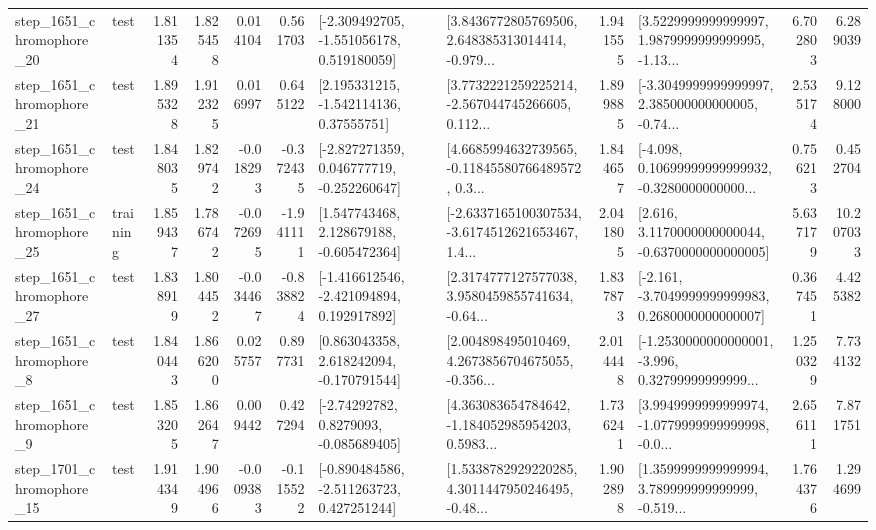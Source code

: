 \begin{tabular}{llrrrrllrlrr}
 step\_1651\_chromophore\_20 &      test &      1.811354 &    1.825458 &      0.014104 &  0.561703 &   [-2.309492705, -1.551056178, 0.519180059] &  [3.8436772805769506, 2.648385313014414, -0.979... &       1.941555 &  [3.5229999999999997, 1.9879999999999995, -1.13... &            6.702803 &          6.289039 \\
 step\_1651\_chromophore\_21 &      test &      1.895328 &    1.912325 &      0.016997 &  0.645122 &     [2.195331215, -1.542114136, 0.37555751] &  [3.7732221259225214, -2.567044745266605, 0.112... &       1.899885 &  [-3.3049999999999997, 2.385000000000005, -0.74... &            2.535174 &          9.128000 \\
 step\_1651\_chromophore\_24 &      test &      1.848035 &    1.829742 &     -0.018293 & -0.372435 &   [-2.827271359, 0.046777719, -0.252260647] &  [4.6685994632739565, -0.11845580766489572, 0.3... &       1.844657 &  [-4.098, 0.10699999999999932, -0.3280000000000... &            0.756213 &          0.452704 \\
 step\_1651\_chromophore\_25 &  training &      1.859437 &    1.786742 &     -0.072695 & -1.941111 &    [1.547743468, 2.128679188, -0.605472364] &  [-2.6337165100307534, -3.6174512621653467, 1.4... &       2.041805 &   [2.616, 3.1170000000000044, -0.6370000000000005] &            5.637179 &         10.207033 \\
 step\_1651\_chromophore\_27 &      test &      1.838919 &    1.804452 &     -0.034467 & -0.838824 &   [-1.416612546, -2.421094894, 0.192917892] &  [2.3174777127577038, 3.9580459855741634, -0.64... &       1.837873 &  [-2.161, -3.7049999999999983, 0.2680000000000007] &            0.367451 &          4.425382 \\
  step\_1651\_chromophore\_8 &      test &      1.840443 &    1.866200 &      0.025757 &  0.897731 &    [0.863043358, 2.618242094, -0.170791544] &  [2.004898495010469, 4.2673856704675055, -0.356... &       2.014448 &  [-1.2530000000000001, -3.996, 0.32799999999999... &            1.250329 &          7.734132 \\
  step\_1651\_chromophore\_9 &      test &      1.853205 &    1.862647 &      0.009442 &  0.427294 &      [-2.74292782, 0.8279093, -0.085689405] &  [4.363083654784642, -1.184052985954203, 0.5983... &       1.736241 &  [3.9949999999999974, -1.0779999999999998, -0.0... &            2.656111 &          7.871751 \\
 step\_1701\_chromophore\_15 &      test &      1.914349 &    1.904966 &     -0.009383 & -0.115522 &   [-0.890484586, -2.511263723, 0.427251244] &  [1.5338782929220285, 4.3011447950246495, -0.48... &       1.902898 &  [1.3599999999999994, 3.789999999999999, -0.519... &            1.764376 &          1.294699 \\

\end{tabular}

